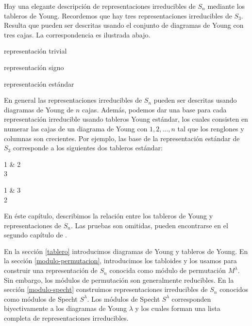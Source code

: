 \documentclass[12pt]{book}
\theoremstyle{definition}
\newcounter{in}
\newcounter{ini}
\begin{document}
Hay una elegante descripción de representaciones irreducibles de
$S_{n}$ mediante los tableros de Young. Recordemos que hay tres representaciones irreducibles de
$S_{3}$. Resulta que pueden ser descritas usando el conjunto de diagramas de
Young con tres cajas. La correspondencia es ilustrada abajo.

\begin{center}
  \begin{minipage}[h]{0.3\linewidth}
    \centering

    representación trivial
  \end{minipage}
  \begin{minipage}[h]{0.3\linewidth}
    \centering

    representación signo
  \end{minipage}
  \begin{minipage}[h]{0.3\linewidth}
    \centering

    representación estándar
  \end{minipage}
\end{center}

En general las representaciones irreducibles de $S_{n}$ pueden ser
descritas usando diagramas de Young de $n$ cajas. Además, podemos dar
una base para cada representación irreducible usando tableros
Young estándar, los cuales consisten en numerar las cajas de un diagrama de
Young con $1,2,\ldots,n$ tal que los renglones y columnas son
crecientes. Por ejemplo, las base de la representación estándar de
$S_{3}$ corresponde a los siguientes dos tableros estándar:

\begin{center}
  \begin{ytableau}
    1 & 2\\
    3
  \end{ytableau} \qquad
  \begin{ytableau}
    1 & 3\\
    2
  \end{ytableau}
\end{center}

En éste capítulo, describimos la relación entre los tableros de Young
y representaciones de $S_{n}$. Las pruebas son omitidas, pueden
encontrarse en el segundo capítulo de \cite{sagan2001symmetric}.

En la sección \ref{tablero} introducimos diagramas de Young y tableros
de Young. En la sección \ref{modulo-permutacion}, introducimos los
tabloides y los usamos para construir una representación de $S_{n}$
conocida como módulo de permutación $M^{\lambda}$. Sin embargo, los
módulos de permutación son generalmente reducibles. En la sección
\ref{modulo-specht} construimos representaciones irreducibles de
$S_{n}$ conocidos como módulos de Specht $S^{\lambda}$. Los módulos de
Specht $S^{\lambda}$ corresponden biyectivamente a los diagramas de
Young $\lambda$ y los cuales forman una lista completa de
representaciones irreducibles. 
\end{document}
